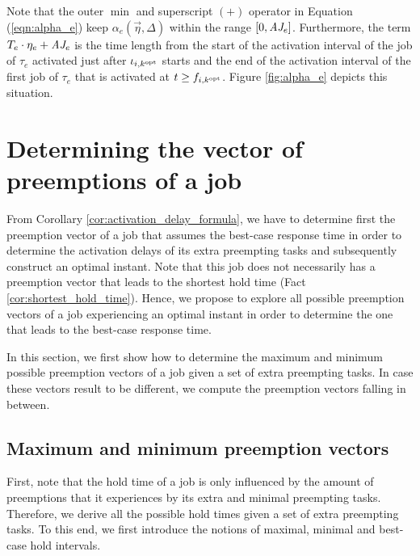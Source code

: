 Note that the outer $\min$ and superscript $(+)$ operator in Equation (\ref{eqn:alpha_e}) keep $\alpha_e(\vec{\eta},\Delta)$ within the range $[0,\mbox{\it AJ}_e]$. Furthermore, the term $T_e \cdot \eta_e + \mbox{\it AJ}_e$ is the time length from the start of the activation interval of the job of $\tau_e$ activated just after $\iota_{i,k^{\rm{opt}}}$ starts and the end of the activation interval of the first job of $\tau_e$ that is activated at $t \geq f_{i,k^{\rm{opt}}}$. Figure \ref{fig:alpha_e} depicts this situation.


\section{Determining the vector of preemptions of a job}\label{sec:hold_times_of_a_job}
From Corollary \ref{cor:activation_delay_formula}, we have to determine first the preemption vector of a job that assumes the best-case response time in order to determine the activation delays of its extra preempting tasks and subsequently construct an optimal instant. Note that this job does not necessarily has a preemption vector that leads to the shortest hold time (Fact \ref{cor:shortest_hold_time}). Hence, we propose to explore all possible preemption vectors of a job experiencing an optimal instant in order to determine the one that leads to the best-case response time.

In this section, we first show how to determine the maximum and minimum possible preemption vectors of a job given a set of extra preempting tasks. In case these vectors result to be different, we compute the preemption vectors falling in between.

\subsection{Maximum and minimum preemption vectors}
First, note that the hold time of a job is only influenced by the amount of preemptions that it experiences by its extra and minimal preempting tasks. Therefore, we derive all the possible hold times given a set of extra preempting tasks. To this end, we first introduce the notions of maximal, minimal and best-case hold intervals.


